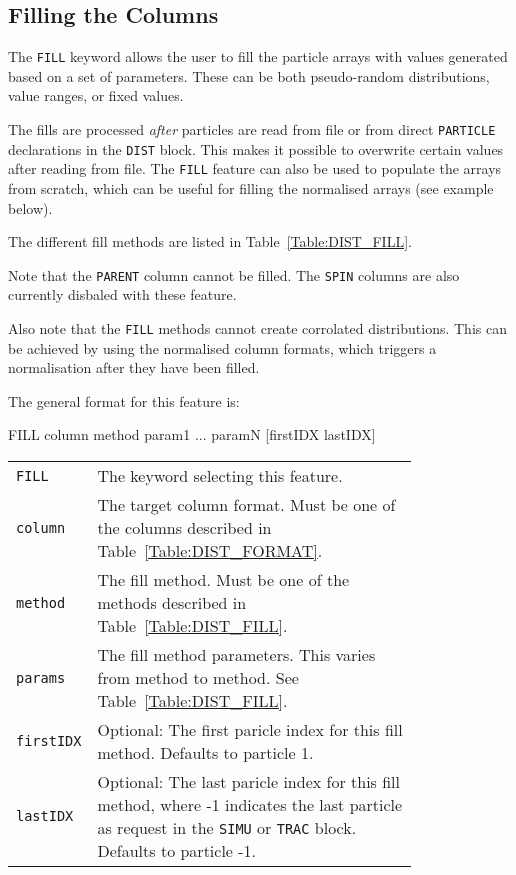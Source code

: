 \subsection{Filling the Columns}

The \texttt{FILL} keyword allows the user to fill the particle arrays with values generated based on a set of parameters.
These can be both pseudo-random distributions, value ranges, or fixed values.

The fills are processed \emph{after} particles are read from file or from direct \texttt{PARTICLE} declarations in the \texttt{DIST} block.
This makes it possible to overwrite certain values after reading from file.
The \texttt{FILL} feature can also be used to populate the arrays from scratch, which can be useful for filling the normalised arrays (see example below).

The different fill methods are listed in Table~\ref{Table:DIST_FILL}.

Note that the \texttt{PARENT} column cannot be filled.
The \texttt{SPIN} columns are also currently disbaled with these feature.

Also note that the \texttt{FILL} methods cannot create corrolated distributions.
This can be achieved by using the normalised column formats, which triggers a normalisation after they have been filled.

\bigskip
\noindent The general format for this feature is:
\begin{cverbatim}
FILL column method param1 ... paramN [firstIDX lastIDX]
\end{cverbatim}

\begin{tabular}{@{}lp{0.8\linewidth}}
    \texttt{FILL}     & The keyword selecting this feature. \\
    \texttt{column}   & The target column format. Must be one of the columns described in Table~\ref{Table:DIST_FORMAT}. \\
    \texttt{method}   & The fill method. Must be one of the methods described in Table~\ref{Table:DIST_FILL}. \\
    \texttt{params}   & The fill method parameters. This varies from method to method. See Table~\ref{Table:DIST_FILL}. \\
    \texttt{firstIDX} & Optional: The first paricle index for this fill method. Defaults to particle 1. \\
    \texttt{lastIDX}  & Optional: The last paricle index for this fill method, where -1 indicates the last particle as request in the \texttt{SIMU} or \texttt{TRAC} block. Defaults to particle -1.
\end{tabular}

